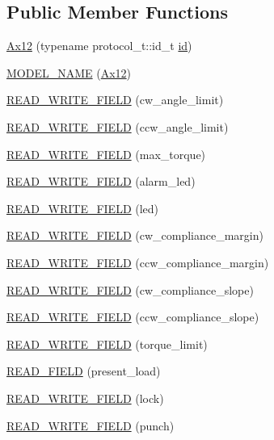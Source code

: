 \subsection*{Public Member Functions}
\begin{DoxyCompactItemize}
\item 
\hyperlink{classdynamixel_1_1servos_1_1_ax12_a6db9721c05735e86c333caf3fe47034c}{Ax12} (typename protocol\+\_\+t\+::id\+\_\+t \hyperlink{classdynamixel_1_1servos_1_1_servo_a2d022081672e25a7bb57b76706e1cc57}{id})
\item 
\hyperlink{classdynamixel_1_1servos_1_1_ax12_ac334056a3c2d120949c80b3d3c4bbeaf}{M\+O\+D\+E\+L\+\_\+\+N\+A\+ME} (\hyperlink{classdynamixel_1_1servos_1_1_ax12}{Ax12})
\item 
\hyperlink{classdynamixel_1_1servos_1_1_ax12_a9bee4a74f0aa928c161363d51a956fbf}{R\+E\+A\+D\+\_\+\+W\+R\+I\+T\+E\+\_\+\+F\+I\+E\+LD} (cw\+\_\+angle\+\_\+limit)
\item 
\hyperlink{classdynamixel_1_1servos_1_1_ax12_a293e5759b7edd383bc5f8b9b657a6a5b}{R\+E\+A\+D\+\_\+\+W\+R\+I\+T\+E\+\_\+\+F\+I\+E\+LD} (ccw\+\_\+angle\+\_\+limit)
\item 
\hyperlink{classdynamixel_1_1servos_1_1_ax12_a327b37972212026e0b83a194031a18ce}{R\+E\+A\+D\+\_\+\+W\+R\+I\+T\+E\+\_\+\+F\+I\+E\+LD} (max\+\_\+torque)
\item 
\hyperlink{classdynamixel_1_1servos_1_1_ax12_a0f712acfa521757072a1d7ece40f4ab5}{R\+E\+A\+D\+\_\+\+W\+R\+I\+T\+E\+\_\+\+F\+I\+E\+LD} (alarm\+\_\+led)
\item 
\hyperlink{classdynamixel_1_1servos_1_1_ax12_a257ac353c0633829b28346f8ea0356fe}{R\+E\+A\+D\+\_\+\+W\+R\+I\+T\+E\+\_\+\+F\+I\+E\+LD} (led)
\item 
\hyperlink{classdynamixel_1_1servos_1_1_ax12_ac8f0a6a260b7640b7a0010560cf21530}{R\+E\+A\+D\+\_\+\+W\+R\+I\+T\+E\+\_\+\+F\+I\+E\+LD} (cw\+\_\+compliance\+\_\+margin)
\item 
\hyperlink{classdynamixel_1_1servos_1_1_ax12_a588350dba232b290ad054a2d3665e498}{R\+E\+A\+D\+\_\+\+W\+R\+I\+T\+E\+\_\+\+F\+I\+E\+LD} (ccw\+\_\+compliance\+\_\+margin)
\item 
\hyperlink{classdynamixel_1_1servos_1_1_ax12_abaaa2f066aa3c7608630361eaf92f3ab}{R\+E\+A\+D\+\_\+\+W\+R\+I\+T\+E\+\_\+\+F\+I\+E\+LD} (cw\+\_\+compliance\+\_\+slope)
\item 
\hyperlink{classdynamixel_1_1servos_1_1_ax12_aa2f70e43d4aefd6eed3513a084d9db2b}{R\+E\+A\+D\+\_\+\+W\+R\+I\+T\+E\+\_\+\+F\+I\+E\+LD} (ccw\+\_\+compliance\+\_\+slope)
\item 
\hyperlink{classdynamixel_1_1servos_1_1_ax12_aa2f51cad8bae903070819910b479d90d}{R\+E\+A\+D\+\_\+\+W\+R\+I\+T\+E\+\_\+\+F\+I\+E\+LD} (torque\+\_\+limit)
\item 
\hyperlink{classdynamixel_1_1servos_1_1_ax12_a06e16bb139c414b725acebd8bef7d27f}{R\+E\+A\+D\+\_\+\+F\+I\+E\+LD} (present\+\_\+load)
\item 
\hyperlink{classdynamixel_1_1servos_1_1_ax12_afcdae5666e8db9cb1fd4f0ad301ba6c5}{R\+E\+A\+D\+\_\+\+W\+R\+I\+T\+E\+\_\+\+F\+I\+E\+LD} (lock)
\item 
\hyperlink{classdynamixel_1_1servos_1_1_ax12_a865d8f4fea840384922f571aefd74570}{R\+E\+A\+D\+\_\+\+W\+R\+I\+T\+E\+\_\+\+F\+I\+E\+LD} (punch)
\end{DoxyCompactItemize}
